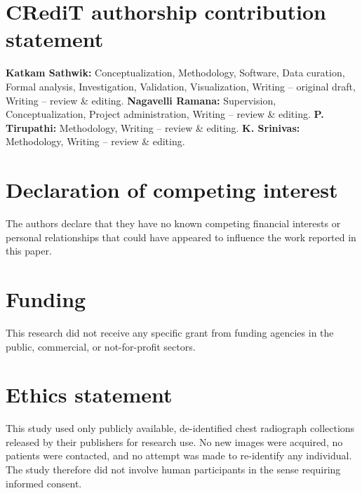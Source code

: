 
\section*{CRediT authorship contribution statement}

\textbf{Katkam Sathwik:} Conceptualization, Methodology, Software, Data curation, Formal analysis, Investigation, Validation, Visualization, Writing -- original draft, Writing -- review \& editing.
\textbf{Nagavelli Ramana:} Supervision, Conceptualization, Project administration, Writing -- review \& editing.
\textbf{P. Tirupathi:} Methodology, Writing -- review \& editing.
\textbf{K. Srinivas:} Methodology, Writing -- review \& editing.

\section*{Declaration of competing interest}
The authors declare that they have no known competing financial interests or personal relationships that could have appeared to influence the work reported in this paper. 

\section*{Funding}
This research did not receive any specific grant from funding agencies in the public, commercial, or not-for-profit sectors. 

\section*{Ethics statement}
This study used only publicly available, de-identified chest radiograph collections released by their publishers for research use. No new images were acquired, no patients were contacted, and no attempt was made to re-identify any individual. The study therefore did not involve human participants in the sense requiring informed consent. 

